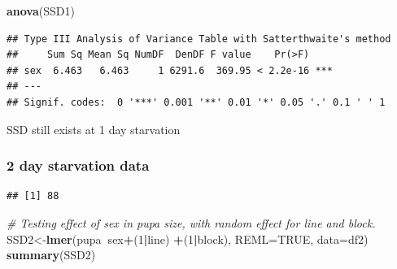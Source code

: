 \documentclass[
]{article}
\newenvironment{Shaded}{\begin{snugshade}}{\end{snugshade}}
\newcommand{\CommentTok}[1]{\textcolor[rgb]{0.56,0.35,0.01}{\textit{#1}}}
\newcommand{\DataTypeTok}[1]{\textcolor[rgb]{0.13,0.29,0.53}{#1}}
\newcommand{\DecValTok}[1]{\textcolor[rgb]{0.00,0.00,0.81}{#1}}
\newcommand{\KeywordTok}[1]{\textcolor[rgb]{0.13,0.29,0.53}{\textbf{#1}}}
\newcommand{\NormalTok}[1]{#1}
\newcommand{\OperatorTok}[1]{\textcolor[rgb]{0.81,0.36,0.00}{\textbf{#1}}}
\newcommand{\OtherTok}[1]{\textcolor[rgb]{0.56,0.35,0.01}{#1}}
\newcommand{\StringTok}[1]{\textcolor[rgb]{0.31,0.60,0.02}{#1}}
\begin{document}
\begin{Shaded}
\begin{Highlighting}[]
\KeywordTok{anova}\NormalTok{(SSD1)}
\end{Highlighting}
\end{Shaded}

\begin{verbatim}
## Type III Analysis of Variance Table with Satterthwaite's method
##     Sum Sq Mean Sq NumDF  DenDF F value    Pr(>F)    
## sex  6.463   6.463     1 6291.6  369.95 < 2.2e-16 ***
## ---
## Signif. codes:  0 '***' 0.001 '**' 0.01 '*' 0.05 '.' 0.1 ' ' 1
\end{verbatim}

SSD still exists at 1 day starvation

\hypertarget{day-starvation-data-1}{%
\subsubsection{2 day starvation data}\label{day-starvation-data-1}}

\begin{Shaded}
\end{Shaded}

\begin{verbatim}
## [1] 88
\end{verbatim}

\begin{Shaded}
\begin{Highlighting}[]
\CommentTok{# Testing effect of sex in pupa size, with random effect for line and block.}
\NormalTok{SSD2<-}\KeywordTok{lmer}\NormalTok{(pupa}\OperatorTok{~}\NormalTok{sex}\OperatorTok{+}\NormalTok{(}\DecValTok{1}\OperatorTok{|}\NormalTok{line) }\OperatorTok{+}\NormalTok{(}\DecValTok{1}\OperatorTok{|}\NormalTok{block), }\DataTypeTok{REML=}\OtherTok{TRUE}\NormalTok{, }\DataTypeTok{data=}\NormalTok{df2)}
\KeywordTok{summary}\NormalTok{(SSD2)}
\end{Highlighting}
\end{Shaded}
\end{document}
